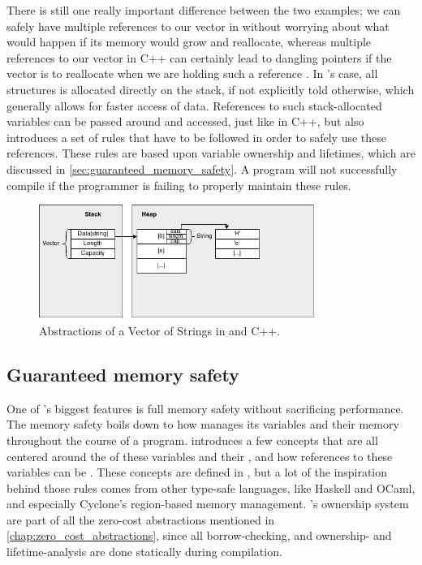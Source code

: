 There is still one really important difference between the two examples; we can safely have multiple references to our vector in {\Java} without worrying about what would happen if its memory would grow and reallocate, whereas multiple references to our vector in C++ can certainly lead to dangling pointers if the vector is to reallocate when we are holding such a reference
.
In {\rust}'s case, all structures is allocated directly on the stack, if not explicitly told otherwise, which generally allows for faster access of data.
References to such stack-allocated variables can be passed around and accessed, just like in C++,
but {\rust} also introduces a set of rules that have to be followed in order to safely use these references.
These rules are based upon variable ownership and lifetimes, which are discussed in \autoref{sec:guaranteed_memory_safety}.
A {\rust} program will not successfully compile if the programmer is failing to properly maintain these rules.

\begin{figure}[tb]
  \begin{center}
    \includegraphics[width=0.8\textwidth]{figures/cpp_abstractions}
  \end{center}
  \caption{Abstractions of a Vector of Strings in {\rust} and C++.}
  \label{fig:cpp_abstractions}
\end{figure}

\subsection{Guaranteed memory safety}
\label{sec:guaranteed_memory_safety}

One of {\rust}'s biggest features is full memory safety \cite{web:rust_book_unsafe} without sacrificing performance.
The memory safety boils down to how {\rust} manages its variables and their memory throughout the course of a program.
\rust introduces a few concepts that are all centered around the  of these variables and their , and how references to these variables can be .
These concepts are defined in {\rust}, but a lot of the inspiration behind those rules comes from other type-safe languages, like Haskell and OCaml, and especially Cyclone's \cite{Grossman2002,Swamy2006} region-based memory management.
\rust's ownership system are part of all the zero-cost abstractions mentioned in \autoref{chap:zero_cost_abstractions}, since all borrow-checking, and ownership- and lifetime-analysis are done statically during compilation.

